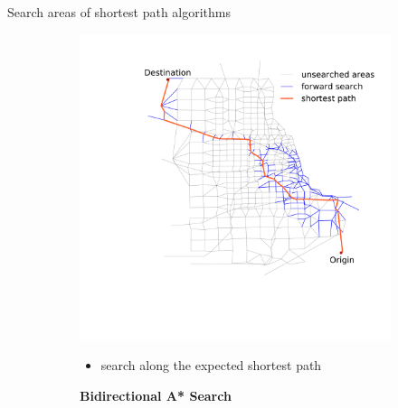 \documentclass[final]{beamer}
\begin{document}
\begin{frame}{ }
\begin{columns}[t]
\begin{column}{.4\linewidth}
\begin{block}{Search areas of shortest path algorithms \vspace{-.2em}}
\begin{figure}
\begin{subfigure}{.5\linewidth}
                    \includegraphics[width=\linewidth,trim=120px 280px 48px 60px,clip]{img/astar}
                    \begin{itemize}
                            \centering
                        \item search along the expected shortest path
                    \end{itemize}
                \end{subfigure}%
                \begin{subfigure}{.5\linewidth}
                    \vspace{1.3em}
                    \centering
                    {\bfseries Bidirectional A* Search}

\end{subfigure}
\end{figure}
\end{block}
\end{column}
\end{columns}
\end{frame}
\end{document}
